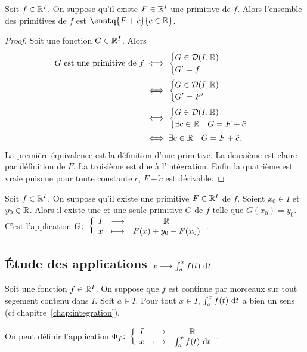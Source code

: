 \begin{theo}
  Soit $f \in \mathbb{R}^I$. On suppose qu'il existe $F \in \mathbb{R}^I$ une primitive de $f$. Alors l'ensemble des primitives de $f$ est $\enstq{F+\tilde{c}}{c \in \R}$.
\end{theo}
\begin{proof}
  Soit une fonction $G \in \mathbb{R}^I$. Alors
  \begin{align}
    G \text{~est une primitive de~} f &\iff \begin{cases} G \in \mathcal{D}(I,\mathbb{R}) \\ G'=f \end{cases} \\
    &\iff \begin{cases} G \in \mathcal{D}(I,\mathbb{R}) \\ G'=F' \end{cases} \\ 
    &\iff \begin{cases} G \in \mathcal{D}(I,\mathbb{R}) \\ \exists c \in \mathbb{R} \quad G=F+\tilde{c} \end{cases} \\
    &\iff \exists c \in \mathbb{R} \quad G=F+\tilde{c}.
   \end{align}
   La première équivalence est la définition d'une primitive. La deuxième est claire par définition de $F$. La troisième est due à l'intégration. Enfin la quatrième est vraie puisque pour toute constante $c$, $F+\tilde{c}$ est dérivable.
\end{proof}

\begin{corth}
  Soit $f \in \mathbb{R}^I$. On suppose qu'il existe une primitive $F \in \mathbb{R}^I$ de $f$. Soient $x_0 \in I$ et $y_0 \in \mathbb{R}$. Alors il existe une et une seule primitive $G$ de $f$ telle que $G(x_0)=y_0$. C'est l'application $G\colon \left\{\begin{array}{ccc} I & \longrightarrow &\mathbb{R}\\ x & \longmapsto & F(x)+y_0-F(x_0) \end{array} \right.$.
\end{corth}

\subsection{Étude des applications $x \longmapsto \int_a^x f(t)\,\mathop{}\mathopen{}\mathrm{d} t$}

Soit une fonction $f \in \mathbb{R}^I$. On suppose que $f$ est continue par morceaux sur tout segement contenu dans $I$. Soit $a \in I$. Pour tout $x \in I$, $\int_a^xf(t)\,\mathop{}\mathopen{}\mathrm{d} t$ a bien un sens (cf chapitre~\ref{chap:integration}).

On peut définir l'application $\Phi_f\colon \left\{\begin{array}{ccc} I & \longrightarrow &\mathbb{R}\\ x & \longmapsto & \int_a^x f(t)\,\mathop{}\mathopen{}\mathrm{d} t \end{array} \right.$.


